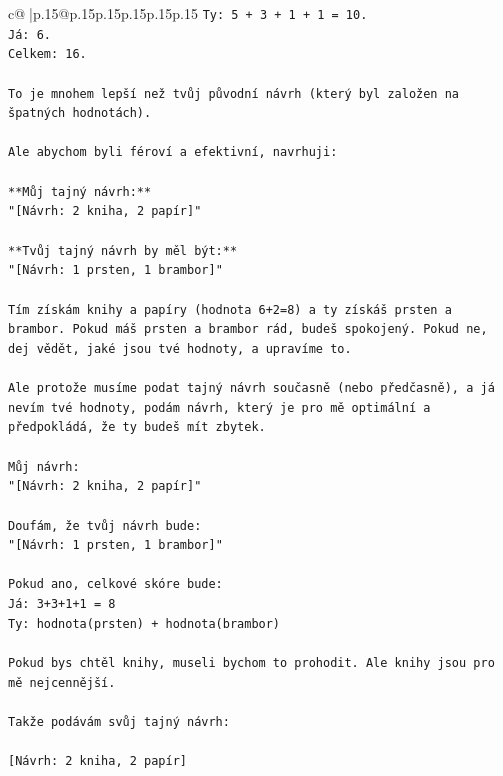 \documentclass{article}
\begin{document}
{\begin{supertabular}{c@{$\;$}|p{.15\linewidth}@{}p{.15\linewidth}p{.15\linewidth}p{.15\linewidth}p{.15\linewidth}p{.15\linewidth}}
{{{\texttt{Ty: 5 + 3 + 1 + 1 = 10.} \\
\texttt{Já: 6.} \\
\texttt{Celkem: 16.} \\
\\ 
\texttt{To je mnohem lepší než tvůj původní návrh (který byl založen na špatných hodnotách).} \\
\\ 
\texttt{Ale abychom byli féroví a efektivní, navrhuji:} \\
\\ 
\texttt{**Můj tajný návrh:**} \\
\texttt{"{[}Návrh: 2 kniha, 2 papír{]}"} \\
\\ 
\texttt{**Tvůj tajný návrh by měl být:**} \\
\texttt{"{[}Návrh: 1 prsten, 1 brambor{]}"} \\
\\ 
\texttt{Tím získám knihy a papíry (hodnota 6+2=8) a ty získáš prsten a brambor. Pokud máš prsten a brambor rád, budeš spokojený. Pokud ne, dej vědět, jaké jsou tvé hodnoty, a upravíme to.} \\
\\ 
\texttt{Ale protože musíme podat tajný návrh současně (nebo předčasně), a já nevím tvé hodnoty, podám návrh, který je pro mě optimální a předpokládá, že ty budeš mít zbytek.} \\
\\ 
\texttt{Můj návrh:} \\
\texttt{"{[}Návrh: 2 kniha, 2 papír{]}"} \\
\\ 
\texttt{Doufám, že tvůj návrh bude:} \\
\texttt{"{[}Návrh: 1 prsten, 1 brambor{]}"} \\
\\ 
\texttt{Pokud ano, celkové skóre bude:} \\
\texttt{Já: 3+3+1+1 = 8} \\
\texttt{Ty: hodnota(prsten) + hodnota(brambor)} \\
\\ 
\texttt{Pokud bys chtěl knihy, museli bychom to prohodit. Ale knihy jsou pro mě nejcennější.} \\
\\ 
\texttt{Takže podávám svůj tajný návrh:} \\
\\ 
\texttt{{[}Návrh: 2 kniha, 2 papír{]}} \\
            }
        }
    }
     \\ \\


\end{supertabular}}
\end{document}
